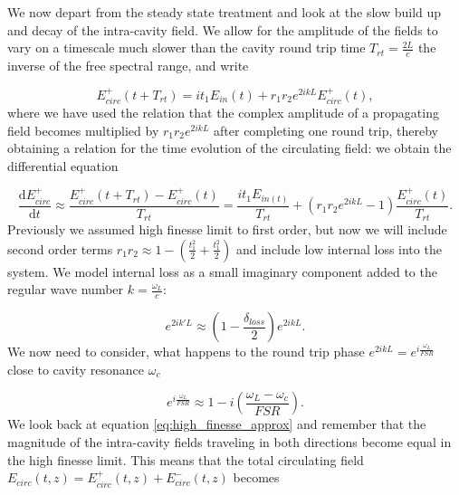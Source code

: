 

We now depart from the steady state treatment and look at the slow build up and decay of the intra-cavity field. We allow for the amplitude of the fields to vary on a timescale much slower than the cavity round trip time $T_{rt} = \frac{2L}{c}$ the inverse of the free spectral range, and write

\begin{equation}
E_{circ}^+(t + T_{rt}) = it_1E_{in}(t) + r_1r_2e^{2ikL}E_{circ}^+(t),
\end{equation}
\noindent
where we have used the relation that the complex amplitude of a propagating field becomes multiplied by $r_1r_2e^{2ikL}$ after completing one round trip, thereby obtaining a relation for the time evolution of the circulating field: we obtain the differential equation

\begin{equation}
\frac{\mathrm{d}E_{circ}^+}{\mathrm{d}t} \approx \frac{E_{circ}^+(t + T_{rt}) - E_{circ}^+(t)}{T_{rt}} = \frac{it_1E_{in(t)}}{T_{rt}} + \left( r_1r_2e^{2ikL} - 1 \right)\frac{E_{circ}^+(t)}{T_{rt}}.
\label{eq:diff_field}
\end{equation}
\noindent
Previously we assumed high finesse limit to first order, but now we will include second order terms $r_1r_2 \approx 1 - (\frac{t_1^2}{2} + \frac{t_1^2}{2})$ and include low internal loss into the system. We model internal loss as a small imaginary component added to the regular wave number $k = \frac{\omega_L}{c}$:

\begin{equation}
e^{2ik'L} \approx \left(1 - \frac{\delta_{loss}}{2}\right)e^{2ikL}.
\end{equation}
\noindent
We now need to consider, what happens to the round trip phase $e^{2ikL}=e^{i\frac{\omega_L}{FSR}}$ close to cavity resonance $\omega_c$

\begin{equation}
e^{i\frac{\omega_L}{FSR}} \approx 1 - i\left( \frac{\omega_L - \omega_c}{FSR}\right).
\end{equation}
\noindent
We look back at equation \eqref{eq:high_finesse_approx} and remember that the magnitude of the intra-cavity fields traveling in both directions become equal in the high finesse limit. This means that the total circulating field $E_{circ}(t, z) = E_{circ}^{+}(t, z) + E_{circ}^{-}(t, z)$ becomes

